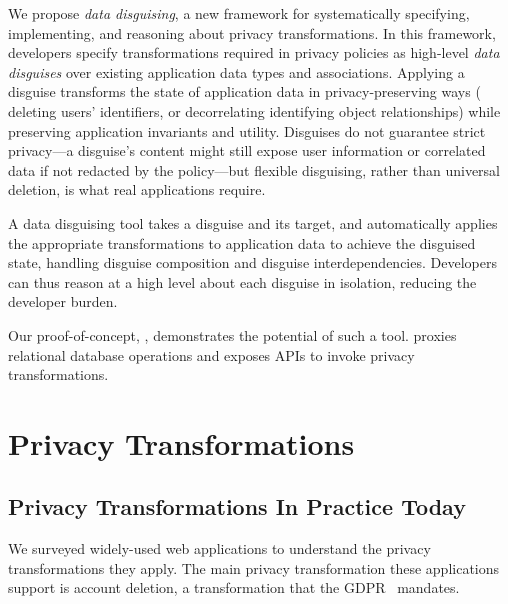 %
We propose \emph{data disguising}, a new framework
for systematically specifying, implementing, and reasoning about  privacy transformations.
%
In this framework, developers specify transformations required in privacy policies as
high-level \emph{data disguises} over existing application data types and associations.
%
Applying a disguise transforms the state of application data in privacy-preserving ways (\eg
deleting users' identifiers, or decorrelating identifying object relationships) while preserving
application invariants and utility.
%
Disguises do not guarantee strict privacy---a disguise's content might still expose user
information or correlated data if not redacted by the policy---but flexible disguising,
rather than universal deletion, is what real applications require.
%

A data disguising tool takes a disguise and its target, and automatically applies the appropriate
transformations to application data to achieve the disguised state, handling 
disguise composition and disguise interdependencies. Developers can
thus reason at a high level about each disguise in isolation, reducing the developer burden.
%

Our proof-of-concept, \sys, demonstrates the potential of such a tool.
%
\sys proxies relational database operations and exposes APIs to invoke privacy transformations.
%

\section{Privacy Transformations}
\label{sec:survey}

\subsection{Privacy Transformations In Practice Today}
%
We surveyed widely-used web applications to understand the privacy
transformations they apply.
%
The main privacy transformation these applications support is account deletion,
a transformation that \eg the GDPR~\cite[Art.\ 17]{eu:gdpr} mandates.
%


